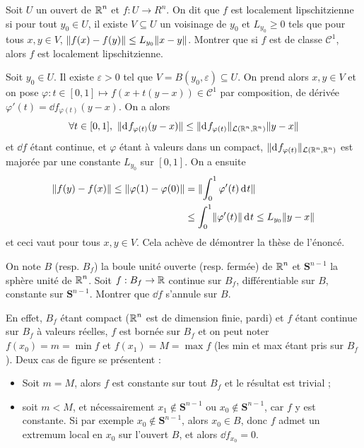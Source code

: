 \begin{exo}
    \label{cd1}
    Soit $U$ un ouvert de $\operatorname{\mathbb R}^n$ et $f:U\to R^n$. 
    On dit que $f$ est localement lipschitzienne si pour tout $y_0\in U$, 
    il existe $V\subseteq U$ un voisinage de $y_0$ et $L_{y_0}\geq 0$ tels que pour tous $x,y\in V$, $\lVert f(x)-f(y)\rVert\leq L_{y_0}\lVert x-y\rVert$.
    Montrer que si $f$ est de classe $\mathcal C^1$, alors $f$ est localement lipschitzienne. 
\end{exo}

\begin{solution}
    Soit $y_0\in U$. 
    Il existe $\varepsilon >0$ tel que $V=B(y_0,\varepsilon)\subseteq U$. 
    On prend alors $x,y\in V$ et on pose $\varphi:t\in[0,1]\mapsto f(x+t(y-x)) \in \mathcal C^1$ par composition,
    de dérivée $\varphi'(t)=\dd f_{\varphi(t)}(y-x)$. 
    On a alors
    \[
        \forall t\in[0,1],\ \lVert\operatorname{d\hskip-1pt} f_{\varphi(t)}(y-x)\rVert\leq\lVert\operatorname{d\hskip-1pt} f_{\varphi(t)}\rVert_{\mathcal L(\operatorname{\mathbb R}^n,\operatorname{\mathbb R}^n)}\lVert y-x\rVert
    \]
    et $\dd f$ étant continue, et $\varphi$ étant à valeurs dans un compact, $\lVert\operatorname{d\hskip-1pt} f_{\varphi(t)}\rVert_{\mathcal L(\operatorname{\mathbb R}^n,\operatorname{\mathbb R}^n)}$ 
    est majorée par une constante $L_{y_0}$ sur $[0,1]$.
    On a ensuite 
    \begin{align*}
        \lVert f(y)-f(x)\rVert\leq\lVert\varphi(1)-\varphi(0)\rVert&=\lVert\int_0^1\varphi'(t)\operatorname{d\hskip-1pt} t\rVert\\ &\leq\int_0^1\lVert\varphi'(t)\rVert\operatorname{d\hskip-1pt} t\leq L_{y_0}\lVert y-x\rVert
    \end{align*}
    et ceci vaut pour tous $x,y\in V$. 
    Cela achève de démontrer la thèse de l'énoncé.
\end{solution}

\begin{exo}
    \label{cd2}
    On note $B$ (resp. $B_f$) la boule unité ouverte (resp. fermée) de $\operatorname{\mathbb R}^n$ et $\mathbf S^{n-1}$ la sphère unité de $\operatorname{\mathbb R}^n$.
    Soit $f:B_f\to\operatorname{\mathbb R}$ continue sur $B_f$, différentiable sur $B$, constante sur $\mathbf S^{n-1}$.
    Montrer que $\dd f$ s'annule sur $B$.
\end{exo}

\begin{solution}
    En effet, $B_f$ étant compact ($\operatorname{\mathbb R}^n$ est de dimension finie, pardi) et $f$ étant continue sur $B_f$ à valeurs réelles,
    $f$ est bornée sur $B_f$ et on peut noter $f(x_0)=m=\min f$ et $f(x_1)=M=\max f$ (les min et max étant pris sur $B_f$).
    Deux cas de figure se présentent :
    \begin{itemize}
        \item Soit $m = M$, alors $f$ est constante sur tout $B_f$ et le résultat est trivial ;
        \item soit $m<M$, et nécessairement $x_1\notin \mathbf S^{n-1}$ ou $x_0\notin \mathbf S^{n-1}$, car $f$ y est constante. 
        Si par exemple $x_0\notin\mathbf S^{n-1}$, alors $x_0\in B$, donc $f$ admet un extremum local en $x_0$ sur l'ouvert $B$, et alors $\dd f_{x_0}=0$.
    \end{itemize}
\end{solution}